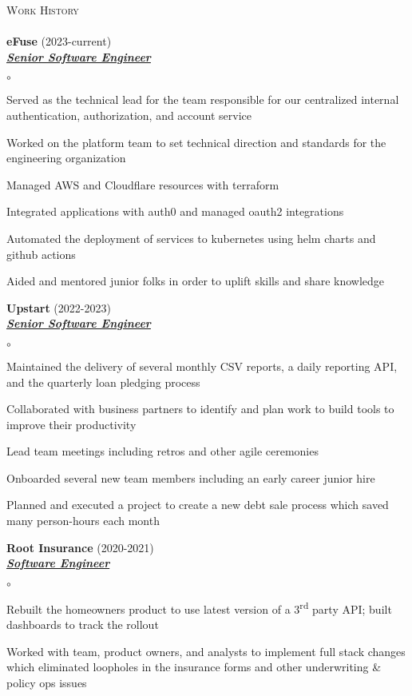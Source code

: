 \documentclass{article}
\newcommand{\lineunder}{\vspace*{-8pt} \\ \hspace*{-18pt} \hrulefill{} \\}
\newcommand{\header}[1]{{\hspace*{-15pt}\vspace*{6pt} \textsc{#1}} \vspace*{-6pt} \lineunder}
\newcommand{\employer}[3]{{ \textbf{#1} (#2)\\ \underline{\textbf{\emph{#3}}}\\  }}
\newenvironment{achievements}{\begin{list}{$\circ$}{\topsep 0pt \itemsep -2pt}}{\vspace*{4pt}\end{list}}
\newcommand{\ts}{\textsuperscript}
\begin{document}
\header{Work History}
\employer{eFuse}{2023-current}{Senior Software Engineer}
	\begin{achievements}
	\item Served as the technical lead for the team responsible for our centralized internal authentication, authorization, and account service
	\item Worked on the platform team to set technical direction and standards for the engineering organization
	\item Managed AWS and Cloudflare resources with terraform
	\item Integrated applications with auth0 and managed oauth2 integrations
	\item Automated the deployment of services to kubernetes using helm charts and github actions
	\item Aided and mentored junior folks in order to uplift skills and share knowledge
	\end{achievements}
\employer{Upstart}{2022-2023}{Senior Software Engineer}
	\begin{achievements}
	\item Maintained the delivery of several monthly CSV reports, a daily reporting API, and the quarterly loan pledging process
	\item Collaborated with business partners to identify and plan work to build tools to improve their productivity
	\item Lead team meetings including retros and other agile ceremonies
	\item Onboarded several new team members including an early career junior hire
	\item Planned and executed a project to create a new debt sale process which saved many person-hours each month
	\end{achievements}
\employer{Root Insurance}{2020-2021}{Software Engineer}
	\begin{achievements}
	\item Rebuilt the homeowners product to use latest version of a 3\ts{rd} party API; built dashboards to track the rollout
	\item Worked with team, product owners, and analysts to implement full stack changes which eliminated loopholes in the insurance forms and other underwriting \& policy ops issues
	\end{achievements}
\end{document}
